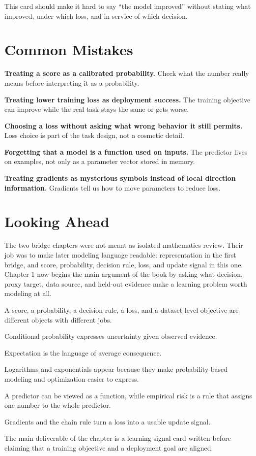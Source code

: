 This card should make it hard to say ``the model improved'' without stating what improved, under which loss, and in service of which decision.

\section*{Common Mistakes}

\begin{mistakebox}
\item \textbf{Treating a score as a calibrated probability.} Check what the number really means before interpreting it as a probability.
\item \textbf{Treating lower training loss as deployment success.} The training objective can improve while the real task stays the same or gets worse.
\item \textbf{Choosing a loss without asking what wrong behavior it still permits.} Loss choice is part of the task design, not a cosmetic detail.
\item \textbf{Forgetting that a model is a function used on inputs.} The predictor lives on examples, not only as a parameter vector stored in memory.
\item \textbf{Treating gradients as mysterious symbols instead of local direction information.} Gradients tell us how to move parameters to reduce loss.
\end{mistakebox}

\section*{Looking Ahead}

The two bridge chapters were not meant as isolated mathematics review. Their job was to make later modeling language readable: representation in the first bridge, and score, probability, decision rule, loss, and update signal in this one. Chapter 1 now begins the main argument of the book by asking what decision, proxy target, data source, and held-out evidence make a learning problem worth modeling at all.

\begin{chaptersummary}
\item A score, a probability, a decision rule, a loss, and a dataset-level objective are different objects with different jobs.
\item Conditional probability expresses uncertainty given observed evidence.
\item Expectation is the language of average consequence.
\item Logarithms and exponentials appear because they make probability-based modeling and optimization easier to express.
\item A predictor can be viewed as a function, while empirical risk is a rule that assigns one number to the whole predictor.
\item Gradients and the chain rule turn a loss into a usable update signal.
\item The main deliverable of the chapter is a learning-signal card written before claiming that a training objective and a deployment goal are aligned.
\end{chaptersummary}

